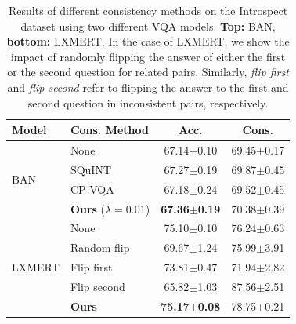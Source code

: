 \begin{table}[!b ]
  \centering
  \begin{tabular}{@{}llcc@{}}
    \toprule
     Model & Cons. Method & Acc. & Cons. \\
     \midrule
     \multirow{4}{*}{BAN} & None & 67.14$\pm$0.10 & 69.45$\pm$0.17 \\
      & SQuINT~\cite{selvaraju2020squinting} & 67.27$\pm$0.19 & 69.87$\pm$0.45 \\
      & CP-VQA~\cite{tascon2022consistency} & 67.18$\pm$0.24 & 69.52$\pm$0.45\\
      & {\bf Ours} ($\lambda=0.01$) & {\bf 67.36$\pm$0.19} & {70.38$\pm$0.39} \\
    \midrule
    \multirow{5}{*}{LXMERT} & None & 75.10$\pm$0.10 & 76.24$\pm$0.63 \\
     & Random flip & 69.67$\pm$1.24 & 75.99$\pm$3.91\\
     & Flip first & 73.81$\pm$0.47 & 71.94$\pm$2.82\\
     & Flip second & 65.82$\pm$1.03 & {87.56$\pm$2.51}\\
     & {\bf Ours} & {\bf 75.17$\pm$0.08} & {78.75$\pm$0.21} \\
    \bottomrule
  \end{tabular}
  \caption{Results of different consistency methods on the Introspect dataset using two different VQA models: \textbf{Top:} BAN, \textbf{bottom:} LXMERT. In the case of LXMERT, we show the impact of randomly flipping the answer of either the first or the second question for related pairs. Similarly, {\it flip first} and {\it flip second} refer to flipping the answer to the first and second question in inconsistent pairs, respectively.}
  \label{tab:results_introspect}
\end{table}

